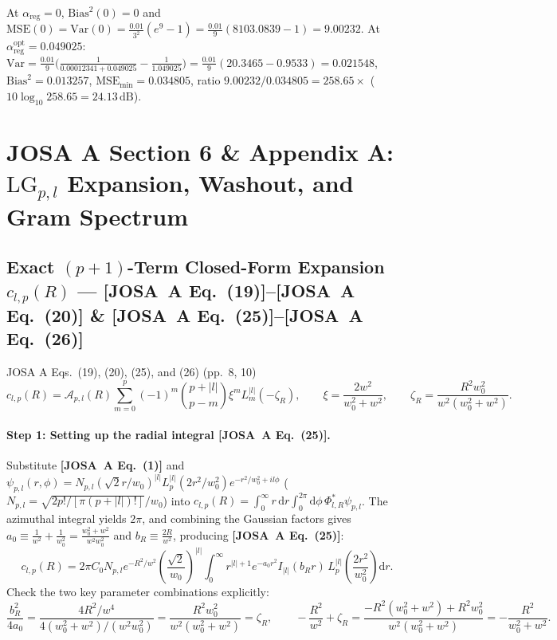 \documentclass[10pt,letterpaper]{article}
\newcommand{\abs}[1]{\lvert #1 \rvert}
\newcommand{\dd}{\mathrm{d}}
\newcommand{\josa}[1]{\textbf{[JOSA~A Eq.~(#1)]}}
\numberwithin{equation}{section}
\begin{document}
\begin{pencheck}[Hand Check of Unregularized Blow-Up vs.\ Optimal Tikhonov ($w k_{\max}=3.0, P_\varepsilon=0.01$)]
At $\alpha_{\mathrm{reg}} = 0$, $\mathrm{Bias}^2(0) = 0$ and $\mathrm{MSE}(0) = \mathrm{Var}(0) = \frac{0.01}{3^2}(e^9 - 1) = \frac{0.01}{9}(8103.0839 - 1) = 9.00232$. At $\alpha_{\mathrm{reg}}^{\mathrm{opt}} = 0.049025$: $\mathrm{Var} = \frac{0.01}{9}\bigl(\frac{1}{0.00012341 + 0.049025} - \frac{1}{1.049025}\bigr) = \frac{0.01}{9}(20.3465 - 0.9533) = 0.021548$, $\mathrm{Bias}^2 = 0.013257$, $\mathrm{MSE}_{\min} = 0.034805$, ratio $9.00232/0.034805 = \mathbf{258.65\times}$ ($10\log_{10}258.65 = \mathbf{24.13\,\mathrm{dB}}$).
\end{pencheck}

\section{JOSA A Section 6 \& Appendix A: $\mathrm{LG}_{p,l}$ Expansion, Washout, and Gram Spectrum}
\label{sec:s6}

\subsection{Exact $(p+1)$-Term Closed-Form Expansion $c_{l,p}(R)$ --- \josa{19}--\josa{20} \& \josa{25}--\josa{26}}
\label{sec:s6_clp}

\begin{targeteq}{JOSA A Eqs.~(19), (20), (25), and (26) (pp.~8, 10)}
\[
  c_{l,p}(R) = \mathcal{A}_{p,l}(R)\sum_{m=0}^p (-1)^m \binom{p+\abs{l}}{p-m} \xi^m L_m^{\abs{l}}(-\zeta_R), \qquad
  \xi = \frac{2w^2}{w_0^2+w^2}, \qquad \zeta_R = \frac{R^2 w_0^2}{w^2(w_0^2+w^2)}.
\]
\end{targeteq}

\paragraph*{Step 1: Setting up the radial integral \josa{25}.}
Substitute \josa{1} and $\psi_{p,l}(r,\phi) = N_{p,l}(\sqrt{2}r/w_0)^{\abs{l}} L_p^{\abs{l}}(2r^2/w_0^2) e^{-r^2/w_0^2 + il\phi}$ ($N_{p,l} = \sqrt{2p!/[\pi(p+\abs{l})!]}/w_0$) into $c_{l,p}(R) = \int_0^\infty r\,\dd r\int_0^{2\pi}\dd\phi\,\Phi_{l,R}^* \psi_{p,l}$. The azimuthal integral yields $2\pi$, and combining the Gaussian factors gives $a_0 \equiv \frac{1}{w^2} + \frac{1}{w_0^2} = \frac{w_0^2+w^2}{w^2 w_0^2}$ and $b_R \equiv \frac{2R}{w^2}$, producing \josa{25}:
\begin{equation}
  c_{l,p}(R) = 2\pi C_0 N_{p,l} e^{-R^2/w^2}\left(\frac{\sqrt{2}}{w_0}\right)^{\abs{l}} \int_0^\infty r^{\abs{l}+1} e^{-a_0 r^2} I_{\abs{l}}(b_R r)\,L_p^{\abs{l}}\!\left(\frac{2r^2}{w_0^2}\right)\dd r.
\end{equation}
Check the two key parameter combinations explicitly:
\begin{equation}
  \frac{b_R^2}{4a_0} = \frac{4R^2/w^4}{4(w_0^2+w^2)/(w^2 w_0^2)} = \frac{R^2 w_0^2}{w^2(w_0^2+w^2)} = \zeta_R, \qquad
  -\frac{R^2}{w^2} + \zeta_R = \frac{-R^2(w_0^2+w^2) + R^2 w_0^2}{w^2(w_0^2+w^2)} = -\frac{R^2}{w_0^2+w^2}.
\end{equation}
\end{document}
